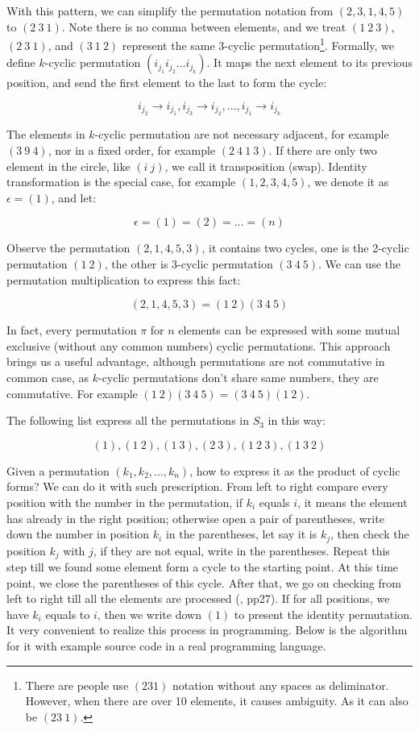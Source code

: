 \documentclass[b5paper]{article}
\begin{document}
With this pattern, we can simplify the permutation notation from $(2, 3, 1, 4, 5)$ to $(2\ 3\ 1)$. Note there is no comma between elements, and we treat $(1\ 2\ 3)$, $(2\ 3\ 1)$, and $(3\ 1\ 2)$ represent the same 3-cyclic permutation\footnote{There are people use $(231)$ notation without any spaces as deliminator. However, when there are over 10 elements, it causes ambiguity. As it can also be $(23\ 1)$.}. Formally, we define $k$-cyclic permutation $(i_{j_1} i_{j_2} ... i_{j_k})$. It maps the next element to its previous position, and send the first element to the last to form the cycle:

\[
i_{j_2} \to i_{j_1}, i_{j_3} \to i_{j_2}, ..., i_{j_1} \to i_{j_k}
\]

The elements in $k$-cyclic permutation are not necessary adjacent, for example $(3\ 9\ 4)$, nor in a fixed order, for example $(2\ 4\ 1\ 3)$. If there are only two element in the circle, like $(i\ j)$, we call it transposition (swap). Identity transformation is the special case, for example $(1, 2, 3, 4, 5)$, we denote it as $\epsilon = (1)$, and let:

\[
\epsilon = (1) = (2) = ... = (n)
\]

Observe the permutation $(2, 1, 4, 5, 3)$, it contains two cycles, one is the 2-cyclic permutation $(1\ 2)$, the other is 3-cyclic permutation $(3\ 4\ 5)$. We can use the permutation multiplication to express this fact:

\[
(2, 1, 4, 5, 3) = (1\ 2)(3\ 4\ 5)
\]

In fact, every permutation $\pi$ for $n$ elements can be expressed with some mutual exclusive (without any common numbers) cyclic permutations. This approach brings us a useful advantage, although permutations are not commutative in common case, as $k$-cyclic permutations don't share same numbers, they are commutative. For example $(1\ 2)(3\ 4\ 5) = (3\ 4\ 5)(1\ 2)$.

The following list express all the permutations in $S_3$ in this way:

\[
(1),
(1\ 2), (1\ 3), (2\ 3),
(1\ 2\ 3), (1\ 3\ 2)
\]

Given a permutation $(k_1, k_2, ..., k_n)$, how to express it as the product of cyclic forms? We can do it with such prescription. From left to right compare every position with the number in the permutation, if $k_i$ equals $i$, it means the element has already in the right position; otherwise open a pair of parentheses, write down the number in position $k_i$ in the parentheses, let say it is $k_j$, then check the position $k_j$ with $j$, if they are not equal, write in the parentheses. Repeat this step till we found some element form a cycle to the starting point. At this time point, we close the parentheses of this cycle. After that, we go on checking from left to right till all the elements are processed (\cite{Armstrong1988}, pp27). If for all positions, we have $k_i$ equals to $i$, then we write down $(1)$ to present the identity permutation. It very convenient to realize this process in programming. Below is the algorithm for it with example source code in a real programming language.
\end{document}
